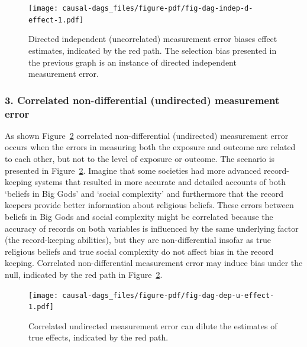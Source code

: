\documentclass[
  singlecolumn]{report}
\begin{document}
\begin{figure}

{\centering \texttt{[image: causal-dags\_files/figure-pdf/fig-dag-indep-d-effect-1.pdf]}

}

\caption{\label{fig-dag-indep-d-effect}Directed independent
(uncorrelated) measurement error biases effect estimates, indicated by
the red path. The selection bias presented in the previous graph is an
instance of directed independent measurement error.}

\end{figure}

\hypertarget{correlated-non-differential-undirected-measurement-error}{%
\subsubsection{\texorpdfstring{3. \textbf{Correlated non-differential
(undirected) measurement
error}}{3. Correlated non-differential (undirected) measurement error}}\label{correlated-non-differential-undirected-measurement-error}}

As shown Figure~\ref{fig-dag-dep-u-effect} correlated non-differential
(undirected) measurement error occurs when the errors in measuring both
the exposure and outcome are related to each other, but not to the level
of exposure or outcome. The scenario is presented in
Figure~\ref{fig-dag-dep-u-effect}. Imagine that some societies had more
advanced record-keeping systems that resulted in more accurate and
detailed accounts of both `beliefs in Big Gods' and `social complexity'
and furthermore that the record keepers provide better information about
religious beliefs. These errors between beliefs in Big Gods and social
complexity might be correlated because the accuracy of records on both
variables is influenced by the same underlying factor (the
record-keeping abilities), but they are non-differential insofar as true
religious beliefs and true social complexity do not affect bias in the
record keeping. Correlated non-differential measurement error may induce
bias under the null, indicated by the red path in
Figure~\ref{fig-dag-dep-u-effect}.

\begin{figure}

{\centering \texttt{[image: causal-dags\_files/figure-pdf/fig-dag-dep-u-effect-1.pdf]}

}

\caption{\label{fig-dag-dep-u-effect}Correlated undirected measurement
error can dilute the estimates of true effects, indicated by the red
path.}

\end{figure}
\end{document}
